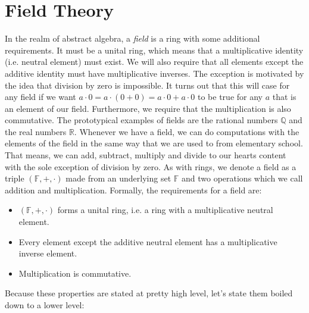 \section{Field Theory}
In the realm of abstract algebra, a \emph{field} is a ring with some additional requirements. It must be a unital ring, which means that a multiplicative identity (i.e. neutral element) must exist. We will also require that all elements except the additive identity must have multiplicative inverses. The exception is motivated by the idea that division by zero is impossible. It turns out that this will case for any field if we want $a \cdot 0 = a \cdot (0 + 0) = a \cdot 0 + a \cdot 0$ to be true for any $a$ that is an element of our field. Furthermore, we require that the multiplication is also commutative. The prototypical examples of fields are the rational numbers $\mathbb{Q}$ and the real numbers $\mathbb{R}$. Whenever we have a field, we can do computations with the elements of the field in the same way that we are used to from elementary school. That means, we can add, subtract, multiply and divide to our hearts content with the sole exception of division by zero. As with rings, we denote a field as a triple $(\mathbb{F}, +, \cdot)$ made from an underlying set $\mathbb{F}$ and two operations which we call addition and multiplication. Formally, the requirements for a field are:
\begin{itemize}
\item $(\mathbb{F},+,\cdot)$ forms a unital ring, i.e. a ring with a multiplicative neutral element.
\item Every element except the additive neutral element has a multiplicative inverse element.
\item Multiplication is commutative.
\end{itemize}
Because these properties are stated at pretty high level, let's state them boiled down to a lower level:


